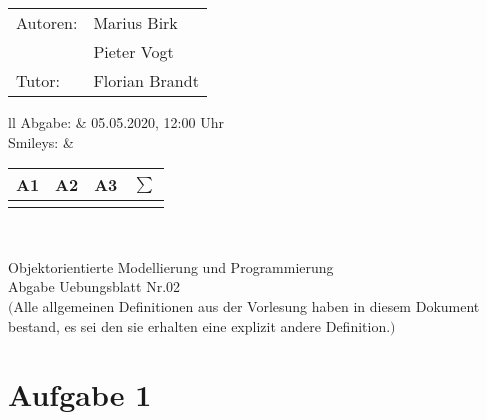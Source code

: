 \documentclass[12pt,a4paper,oneside,ngerman]{article}
\newcommand{\fach}{Objektorientierte Modellierung und Programmierung}
\newcommand{\dokumentenTitel}{Abgabe Uebungsblatt Nr.02}
\newcommand{\Abgabe}{05.05.2020, 12:00 Uhr}
\newcommand{\memberOne}{Marius Birk}
\newcommand{\memberTwo}{Pieter Vogt}
\newcommand{\tutor}{ Florian Brandt }
\begin{document}
	\thispagestyle{plain} %
	
	\begin{multicols}{2} %
		\hspace{-1cm} %
		\begin{tabular}{ll} %
			Autoren: & \memberOne \\ %
			& \memberTwo \\
			Tutor: & \tutor \\  
		\end{tabular}
		
		\columnbreak %
		\hspace{-1cm} %
		\begin{tabular}{ll} %
			Abgabe: & \Abgabe \\ %
			Smileys: &  
			\renewcommand{\arraystretch}{1.2} 
			\begin{tabular}{|p{0.8cm}|p{0.8cm}|p{0.8cm}|p{0.8cm}|}
				\hline A1 & A2 & A3 & $\sum\limits^{ }$ \\ \hline
				& & & \\ \hline    
			\end{tabular} \\
		\end{tabular}
		
	\end{multicols} %
	
	\begin{center}
		\Large{\fach} \\
		\LARGE{\dokumentenTitel} \\
		\small
		$($Alle allgemeinen Definitionen aus der Vorlesung haben in diesem Dokument bestand, es sei den sie erhalten eine explizit andere Definition.$)$
    \end{center}


	\section{Aufgabe 1}
\end{document}
